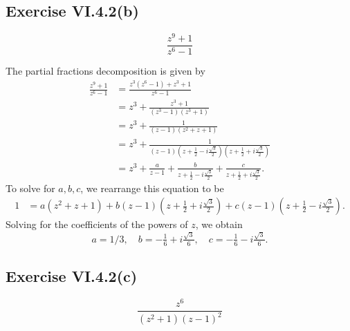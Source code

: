 \documentclass[12pt]{article}
\newenvironment{pbox}
    {\begin{lrbox}{\mybox}\begin{minipage}{0.98\textwidth}}
    {\end{minipage}\end{lrbox}\begin{center}\framebox[\textwidth]{\usebox{\mybox}}\end{center}}
\theoremstyle{definition}
\begin{document}
\newpage
\subsection{Exercise VI.4.2(b)}
\begin{pbox}
    \[
        \frac{z^9 + 1}{z^6 - 1}
    \]
\end{pbox}

The partial fractions decomposition is given by
\begin{align*}
    \frac{z^9 + 1}{z^6 - 1}
        &= \frac{z^3(z^6 - 1) + z^3 + 1}{z^6 - 1} \\
        &= z^3 + \frac{z^3 + 1}{(z^3 - 1)(z^3 + 1)} \\
        &= z^3 + \frac{1}{(z - 1)(z^2 + z + 1)} \\
        &= z^3 + \frac{1}{(z - 1)(z + \frac12 - i\frac{\sqrt{3}}{2})(z + \frac12 + i\frac{\sqrt{3}}{2})} \\
        &= z^3 + \frac{a}{z - 1} + \frac{b}{z + \frac12 - i\frac{\sqrt{3}}{2}} + \frac{c}{z + \frac12 + i\frac{\sqrt{3}}{2}}.
\end{align*}
To solve for $a, b, c$, we rearrange this equation to be
\begin{align*}
    1
        &= a(z^2 + z + 1) + b(z - 1)\left(z + \tfrac12 + i\tfrac{\sqrt{3}}{2}\right) + c(z - 1)\left(z + \tfrac12 - i\tfrac{\sqrt{3}}{2}\right).
\end{align*}
Solving for the coefficients of the powers of $z$, we obtain
\[
    a = 1/3, \quad b = -\tfrac16 + i\tfrac{\sqrt{3}}{6},   \quad c = - \tfrac16 - i\tfrac{\sqrt{3}}{6}.
\]

\newpage
\subsection{Exercise VI.4.2(c)}
\begin{pbox}
    \[
        \frac{z^6}{(z^2 + 1)(z - 1)^2}
    \]
\end{pbox}
\end{document}
